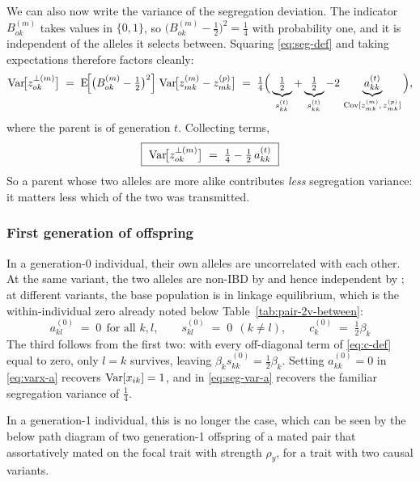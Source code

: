 \documentclass[12pt]{article}
\begin{document}
We can also now write the variance of the segregation deviation.
The indicator $B^{(m)}_{ok}$ takes values in $\{0,1\}$, so $\big(B^{(m)}_{ok} - \tfrac12\big)^2 = \tfrac14$ with probability one, and it is independent of the alleles it selects between.
Squaring \eqref{eq:seg-def} and taking expectations therefore factors cleanly:
\begin{equation}\label{eq:seg-var-deriv}
    \mathrm{Var}\!\big[z^{\perp(m)}_{ok}\big]
    \;=\; \mathrm{E}\!\Big[\big(B^{(m)}_{ok} - \tfrac12\big)^2\Big]\; \mathrm{Var}\!\big[z^{(m)}_{mk} - z^{(p)}_{mk}\big]
    \;=\; \tfrac14\Big(\underbrace{\tfrac12}_{s^{(t)}_{kk}} + \underbrace{\tfrac12}_{s^{(t)}_{kk}} - 2\,\underbrace{a^{(t)}_{kk}}_{\mathrm{Cov}[z^{(m)}_{mk},\, z^{(p)}_{mk}]}\Big) ,
\end{equation}
where the parent is of generation $t$. Collecting terms,
\begin{equation}\label{eq:seg-var-a}
    \boxed{\ \mathrm{Var}\!\big[z^{\perp(m)}_{ok}\big] \;=\; \tfrac14 - \tfrac12\,a^{(t)}_{kk} \ }
\end{equation}
So a parent whose two alleles are more alike contributes \emph{less} segregation variance: it matters less which of the two was transmitted.

\subsubsection*{First generation of offspring}

In a generation-0 individual, their own alleles are uncorrelated with each other.
At the same variant, the two alleles are non-IBD by  and hence independent by ; at different variants, the base population is in linkage equilibrium, which is the within-individual zero already noted below Table~\ref{tab:pair-2v-between}:
\begin{equation}\label{eq:as-gen0}
    \boxed{\ a^{(0)}_{kl} \;=\; 0 \ \ \text{for all } k, l ,
    \qquad
    s^{(0)}_{kl} \;=\; 0 \ \ (k \neq l),
    \qquad
    c^{(0)}_k \;=\; \tfrac12\beta_k \ }
\end{equation}
The third follows from the first two: with every off-diagonal term of \eqref{eq:c-def} equal to zero, only $l=k$ survives, leaving $\beta_k s^{(0)}_{kk} = \tfrac12\beta_k$.
Setting $a^{(0)}_{kk} = 0$ in \eqref{eq:varx-a} recovers $\mathrm{Var}[x_{ik}] = 1$, and in \eqref{eq:seg-var-a} recovers the familiar segregation variance of $\tfrac14$.

In a generation-1 individual, this is no longer the case, which can be seen by the below path diagram of two generation-1 offspring of a mated pair that assortatively mated on the focal trait with strength $\rho_y$, for a trait with two causal variants.
\end{document}
